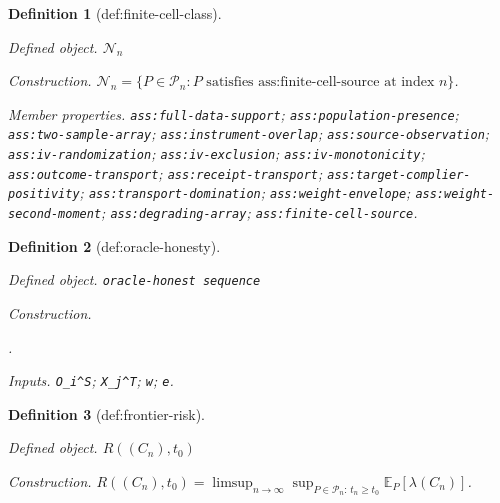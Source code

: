 \documentclass{article}
\newtheorem{definition}{Definition}
\begin{document}
\begin{definition}[def:finite-cell-class]\label{def:finite-cell-class}
\par\smallskip\noindent\emph{Defined object.} \(\mathcal N_n\)
\par\smallskip\noindent\emph{Construction.} \(\mathcal N_n=\{P\in\mathcal P_n:P\text{ satisfies ass:finite-cell-source at index }n\}\).
\par\smallskip\noindent\emph{Member properties.} \texttt{ass:\allowbreak{}full-\allowbreak{}data-\allowbreak{}support}; \texttt{ass:\allowbreak{}population-\allowbreak{}presence}; \texttt{ass:\allowbreak{}two-\allowbreak{}sample-\allowbreak{}array}; \texttt{ass:\allowbreak{}instrument-\allowbreak{}overlap}; \texttt{ass:\allowbreak{}source-\allowbreak{}observation}; \texttt{ass:\allowbreak{}iv-\allowbreak{}randomization}; \texttt{ass:\allowbreak{}iv-\allowbreak{}exclusion}; \texttt{ass:\allowbreak{}iv-\allowbreak{}monotonicity}; \texttt{ass:\allowbreak{}outcome-\allowbreak{}transport}; \texttt{ass:\allowbreak{}receipt-\allowbreak{}transport}; \texttt{ass:\allowbreak{}target-\allowbreak{}complier-\allowbreak{}positivity}; \texttt{ass:\allowbreak{}transport-\allowbreak{}domination}; \texttt{ass:\allowbreak{}weight-\allowbreak{}envelope}; \texttt{ass:\allowbreak{}weight-\allowbreak{}second-\allowbreak{}moment}; \texttt{ass:\allowbreak{}degrading-\allowbreak{}array}; \texttt{ass:\allowbreak{}finite-\allowbreak{}cell-\allowbreak{}source}.
\end{definition}

\begin{definition}[def:oracle-honesty]\label{def:oracle-honesty}
\par\smallskip\noindent\emph{Defined object.} \texttt{oracle-\allowbreak{}honest sequence}
\par\smallskip\noindent\emph{Construction.} \par\noindent {}\par\noindent.
\par\smallskip\noindent\emph{Inputs.} \texttt{O\_\allowbreak{}i\textasciicircum{}S}; \texttt{X\_\allowbreak{}j\textasciicircum{}T}; \texttt{w}; \texttt{e}.
\end{definition}

\begin{definition}[def:frontier-risk]\label{def:frontier-risk}
\par\smallskip\noindent\emph{Defined object.} \(R((C_n),t_0)\)
\par\smallskip\noindent\emph{Construction.} \(R((C_n),t_0)=\limsup_{n\to\infty}\sup_{P\in\mathcal P_n:\,t_n\ge t_0}\mathbb E_P[\lambda(C_n)]\).
\end{definition}
\end{document}
